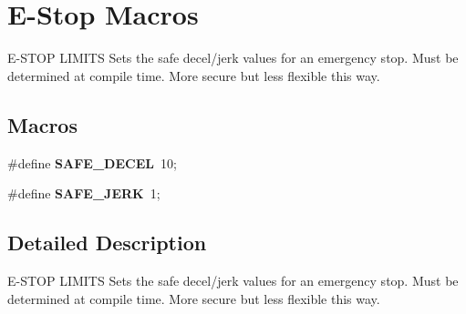\hypertarget{group__e__macros}{}\section{E-\/\+Stop Macros}
\label{group__e__macros}


E-\/\+S\+T\+OP L\+I\+M\+I\+TS Sets the safe decel/jerk values for an emergency stop. Must be determined at compile time. More secure but less flexible this way.  


\subsection*{Macros}
\begin{DoxyCompactItemize}
\item 
\hypertarget{group__e__macros_ga8a036afcbdb903e6e87a662a82573818}{}\label{group__e__macros_ga8a036afcbdb903e6e87a662a82573818} 
\#define {\bfseries S\+A\+F\+E\+\_\+\+D\+E\+C\+EL}~10;
\item 
\hypertarget{group__e__macros_ga5fc2e8a4a2d9182086f5e54a9df0211f}{}\label{group__e__macros_ga5fc2e8a4a2d9182086f5e54a9df0211f} 
\#define {\bfseries S\+A\+F\+E\+\_\+\+J\+E\+RK}~1;
\end{DoxyCompactItemize}


\subsection{Detailed Description}
E-\/\+S\+T\+OP L\+I\+M\+I\+TS Sets the safe decel/jerk values for an emergency stop. Must be determined at compile time. More secure but less flexible this way. 

